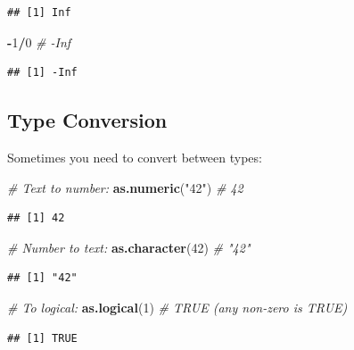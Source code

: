 \documentclass[
]{article}
\newenvironment{Shaded}{\begin{snugshade}}{\end{snugshade}}
\newcommand{\CommentTok}[1]{\textcolor[rgb]{0.56,0.35,0.01}{\textit{#1}}}
\newcommand{\DecValTok}[1]{\textcolor[rgb]{0.00,0.00,0.81}{#1}}
\newcommand{\FunctionTok}[1]{\textcolor[rgb]{0.13,0.29,0.53}{\textbf{#1}}}
\newcommand{\NormalTok}[1]{#1}
\newcommand{\SpecialCharTok}[1]{\textcolor[rgb]{0.81,0.36,0.00}{\textbf{#1}}}
\newcommand{\StringTok}[1]{\textcolor[rgb]{0.31,0.60,0.02}{#1}}
\begin{document}
\begin{verbatim}
## [1] Inf
\end{verbatim}

\begin{Shaded}
\begin{Highlighting}[]
\SpecialCharTok{{-}}\DecValTok{1}\SpecialCharTok{/}\DecValTok{0}  \CommentTok{\# {-}Inf}
\end{Highlighting}
\end{Shaded}

\begin{verbatim}
## [1] -Inf
\end{verbatim}

\subsection{Type Conversion}\label{type-conversion}

Sometimes you need to convert between types:

\begin{Shaded}
\begin{Highlighting}[]
\CommentTok{\# Text to number:}
\FunctionTok{as.numeric}\NormalTok{(}\StringTok{"42"}\NormalTok{)     }\CommentTok{\# 42}
\end{Highlighting}
\end{Shaded}

\begin{verbatim}
## [1] 42
\end{verbatim}

\begin{Shaded}
\begin{Highlighting}[]
\CommentTok{\# Number to text:}
\FunctionTok{as.character}\NormalTok{(}\DecValTok{42}\NormalTok{)     }\CommentTok{\# "42"}
\end{Highlighting}
\end{Shaded}

\begin{verbatim}
## [1] "42"
\end{verbatim}

\begin{Shaded}
\begin{Highlighting}[]
\CommentTok{\# To logical:}
\FunctionTok{as.logical}\NormalTok{(}\DecValTok{1}\NormalTok{)        }\CommentTok{\# TRUE (any non{-}zero is TRUE)}
\end{Highlighting}
\end{Shaded}

\begin{verbatim}
## [1] TRUE
\end{verbatim}
\end{document}
